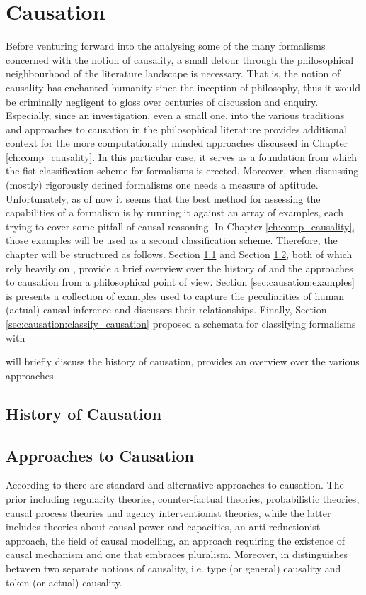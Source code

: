 \documentclass[11pt,a4paper]{book}
\theoremstyle{definition}
\theoremstyle{definition}
\theoremstyle{definition}
\theoremstyle{remark}
\begin{document}
\chapter{Causation}
Before venturing forward into the analysing some of the many formalisms concerned with the notion of causality, a small detour through the philosophical neighbourhood of the literature landscape is necessary. 
That is, the notion of causality has enchanted humanity since the inception of philosophy, thus it would be criminally negligent to gloss over centuries of discussion and enquiry.  
Especially, since an investigation, even a small one, into the various traditions and approaches to causation in the philosophical literature provides additional context for the more computationally minded approaches discussed in 
Chapter \ref{ch:comp_causality}. In this particular case, it serves as a foundation from which the fist classification scheme for formalisms is erected. 
Moreover, when discussing (mostly) rigorously defined formalisms one needs a measure of aptitude.  Unfortunately, as of now it seems that the best method for assessing the capabilities of a formalism is by running it against an array of examples, each trying to cover some pitfall of causal reasoning. In Chapter \ref{ch:comp_causality}, those examples will be used as a second classification scheme. 
Therefore, the chapter will be structured as follows.
Section \ref{sec:causation:history_of_causation} and Section \ref{sec:causation:approaches_to_causation}, both of which rely heavily on \cite{beebee2009oxford}, provide a brief overview over the history of and the approaches to causation from a philosophical point of view. Section \ref{sec:causation:examples} is presents a collection of examples used to capture the peculiarities of human (actual) causal inference and discusses their relationships. 
Finally, Section \ref{sec:causation:classify_causation} proposed a schemata for classifying formalisms  with


will briefly discuss the history of causation, 
 provides an overview over the various approaches


\section{History of Causation}
\label{sec:causation:history_of_causation}

\section{Approaches to Causation}
\label{sec:causation:approaches_to_causation}
According to \cite{beebee2009oxford} there are standard and alternative approaches to causation. The prior including regularity theories, counter-factual theories, probabilistic theories, causal process theories and agency interventionist theories, while the latter includes theories about causal power and capacities, an anti-reductionist approach, the field of causal modelling, an approach requiring the existence of causal mechanism and one that embraces pluralism. Moreover, in \cite{halpern2016actual} distinguishes between two separate notions of causality, i.e. type (or general) causality and token (or actual) causality. 
\end{document}
